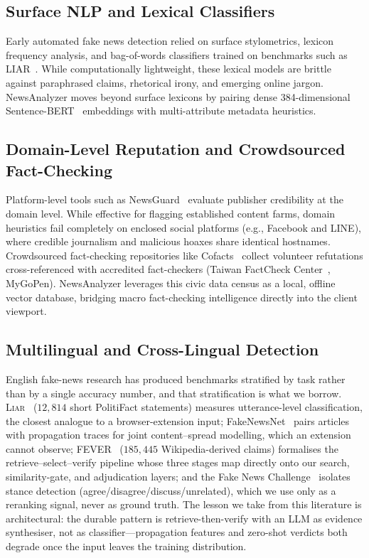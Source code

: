 \documentclass[twoside]{llncs}
\begin{document}
\subsection{Surface NLP and Lexical Classifiers}
Early automated fake news detection relied on surface stylometrics, lexicon frequency analysis, and bag-of-words classifiers trained on benchmarks such as LIAR~\cite{wang2017liar, perez2018automatic, rashkin2017truth, potthast2018stylometric}. While computationally lightweight, these lexical models are brittle against paraphrased claims, rhetorical irony, and emerging online jargon. NewsAnalyzer moves beyond surface lexicons by pairing dense 384-dimensional Sentence-BERT~\cite{reimers2019sbert} embeddings with multi-attribute metadata heuristics.

\subsection{Domain-Level Reputation and Crowdsourced Fact-Checking}
Platform-level tools such as NewsGuard~\cite{Bianchi2024trustworthiness} evaluate publisher credibility at the domain level. While effective for flagging established content farms, domain heuristics fail completely on enclosed social platforms (e.g., Facebook and LINE), where credible journalism and malicious hoaxes share identical hostnames. Crowdsourced fact-checking repositories like Cofacts~\cite{cofacts2020, lim2023factchecking} collect volunteer refutations cross-referenced with accredited fact-checkers (Taiwan FactCheck Center~\cite{tfc2023}, MyGoPen). NewsAnalyzer leverages this civic data census as a local, offline vector database, bridging macro fact-checking intelligence directly into the client viewport.

\subsection{Multilingual and Cross-Lingual Detection}
English fake-news research has produced benchmarks stratified by task rather than by a single accuracy number, and that stratification is what we borrow. \textsc{Liar}~\cite{wang2017liar} ($12{,}814$ short PolitiFact statements) measures utterance-level classification, the closest analogue to a browser-extension input; FakeNewsNet~\cite{shu2020fakenewsnet} pairs articles with propagation traces for joint content--spread modelling, which an extension cannot observe; FEVER~\cite{thorne2018fever} ($185{,}445$ Wikipedia-derived claims) formalises the retrieve--select--verify pipeline whose three stages map directly onto our search, similarity-gate, and adjudication layers; and the Fake News Challenge~\cite{fnc2017challenge} isolates stance detection (agree/disagree/discuss/unrelated), which we use only as a reranking signal, never as ground truth. The lesson we take from this literature is architectural: the durable pattern is retrieve-then-verify with an LLM as evidence synthesiser, not as classifier---propagation features and zero-shot verdicts both degrade once the input leaves the training distribution.
\end{document}
